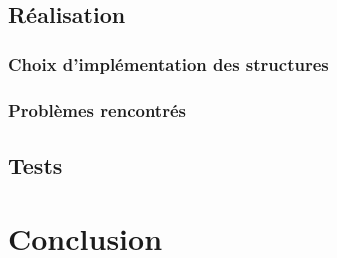 	\section{Réalisation}
		\subsection{Choix d'implémentation des structures}
	
		\subsection{Problèmes rencontrés}


	\section{Tests}
	
\chapter*{Conclusion}

